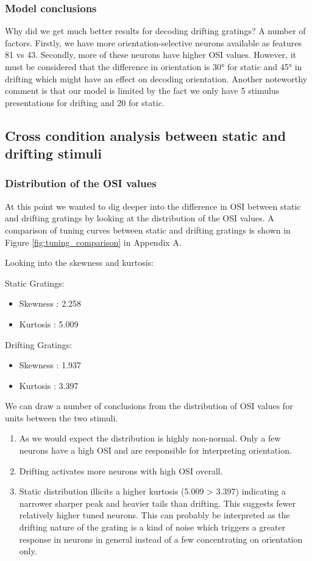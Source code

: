 \documentclass[10pt,twocolumn]{article}
\begin{document}
\subsubsection{Model conclusions}

Why did we get much better results for decoding drifting gratings? A number of factors. Firstly, we have more orientation-selective neurons available as features 81 vs 43. Secondly, more of these neurons have higher OSI values. However, it must be considered that the difference in orientation is 30° for static and 45° in drifting which might have an effect on decoding orientation. Another noteworthy comment is that our model is limited by the fact we only have 5 stimulus presentations for drifting and 20 for static.

\subsection{Cross condition analysis between static and drifting stimuli}

\subsubsection{Distribution of the OSI values}

At this point we wanted to dig deeper into the difference in OSI between static and drifting gratings by looking at the distribution of the OSI values. A comparison of tuning curves between static and drifting gratings is shown in Figure \ref{fig:tuning_comparison} in Appendix A.

Looking into the skewness and kurtosis:

Static Gratings:
\begin{itemize}
  \item Skewness : 2.258
  \item Kurtosis : 5.009
\end{itemize}

Drifting Gratings:
\begin{itemize}
  \item Skewness : 1.937
  \item Kurtosis : 3.397
\end{itemize}

We can draw a number of conclusions from the distribution of OSI values for units between the two stimuli.

\begin{enumerate}
    \item As we would expect the distribution is highly non-normal. Only a few neurons have a high OSI and are responsible for interpreting orientation.
    \item Drifting activates more neurons with high OSI overall.
    \item Static distribution illicits a higher kurtosis (5.009 > 3.397) indicating a narrower sharper peak and heavier tails than drifting. This suggests fewer relatively higher tuned neurons. This can probably be interpreted as the drifting nature of the grating is a kind of noise which triggers a greater response in neurons in general instead of a few concentrating on orientation only.
\end{enumerate}
\end{document}
